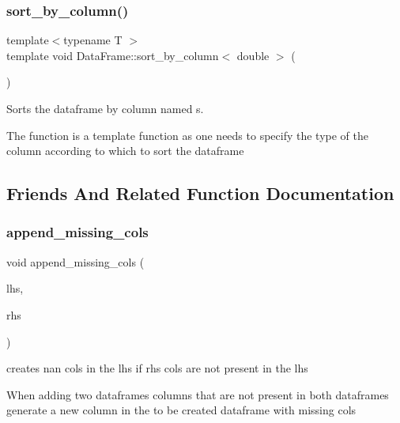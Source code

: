 \subsubsection{\texorpdfstring{sort\+\_\+by\+\_\+column()}{sort\_by\_column()}}
{\footnotesize\ttfamily template$<$typename T $>$ \\
template void Data\+Frame\+::sort\+\_\+by\+\_\+column$<$ double $>$ (\begin{DoxyParamCaption}\item[{const std\+::string \&}]{ }\end{DoxyParamCaption})}



Sorts the dataframe by column named s. 

The function is a template function as one needs to specify the type of the column according to which to sort the dataframe 

\subsection{Friends And Related Function Documentation}
\mbox{\label{classDataFrame_a27cc8acd51a5cd40e6a2726368914661}} 
\subsubsection{\texorpdfstring{append\+\_\+missing\+\_\+cols}{append\_missing\_cols}}
{\footnotesize\ttfamily void append\+\_\+missing\+\_\+cols (\begin{DoxyParamCaption}\item[{\hyperlink{classDataFrame}{Data\+Frame} \&}]{lhs,  }\item[{const \hyperlink{classDataFrame}{Data\+Frame} \&}]{rhs }\end{DoxyParamCaption})\hspace{0.3cm}{\ttfamily [friend]}}



creates nan cols in the lhs if rhs cols are not present in the lhs 

When adding two dataframes columns that are not present in both dataframes generate a new column in the to be created dataframe with missing cols \mbox{\label{classDataFrame_a221d3063f94569b545fe4c3ae56597e8}} 
